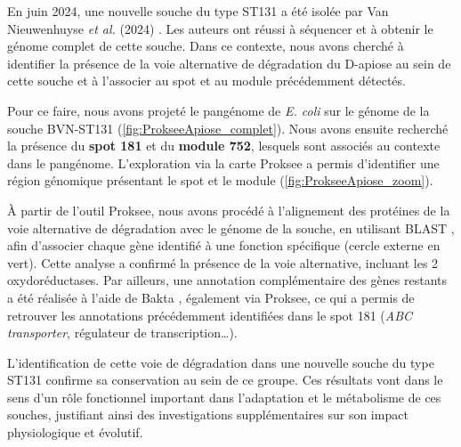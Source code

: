 En juin 2024, une nouvelle souche du type ST131 a été isolée par Van Nieuwenhuyse \textit{et al.} (2024) \cite{van_nieuwenhuyse_phage-mediated_2024}. Les auteurs ont réussi à séquencer et à obtenir le génome complet de cette souche. Dans ce contexte, nous avons cherché à identifier la présence de la voie alternative de dégradation du D-apiose au sein de cette souche et à l'associer au spot et au module précédemment détectés.

Pour ce faire, nous avons projeté le pangénome de \textit{E. coli} sur le génome de la souche BVN-ST131 (\autoref{fig:ProkseeApiose_complet}). Nous avons ensuite recherché la présence du \textbf{spot 181} et du \textbf{module 752}, lesquels sont associés au contexte dans le pangénome. L'exploration via la carte Proksee \cite{grant_proksee_2023} a permis d'identifier une région génomique présentant le spot et le module (\autoref{fig:ProkseeApiose_zoom}).

À partir de l'outil Proksee, nous avons procédé à l'alignement des protéines de la voie alternative de dégradation avec le génome de la souche, en utilisant BLAST \cite{altschul_basic_1990}, afin d'associer chaque gène identifié à une fonction spécifique (cercle externe en vert). Cette analyse a confirmé la présence de la voie alternative, incluant les 2 oxydoréductases. Par ailleurs, une annotation complémentaire des gènes restants a été réalisée à l'aide de Bakta \cite{schwengers_bakta_2021}, également via Proksee, ce qui a permis de retrouver les annotations précédemment identifiées dans le spot 181 (\textit{ABC transporter}, régulateur de transcription\dots).

L'identification de cette voie de dégradation dans une nouvelle souche du type ST131 confirme sa conservation au sein de ce groupe. Ces résultats vont dans le sens d'un rôle fonctionnel important dans l'adaptation et le métabolisme de ces souches, justifiant ainsi des investigations supplémentaires sur son impact physiologique et évolutif.

